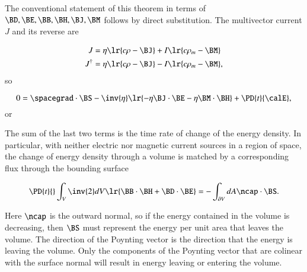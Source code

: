 The conventional statement of this theorem in terms of \( \BD, \BE, \BB, \BH, \BJ, \BM \) follows by direct substitution.
The multivector current \( J \) and its reverse are

\begin{dmath}\label{eqn:poyntingTheorem:160}
\begin{aligned}
J &= \eta \lr{ c \rho - \BJ } + I \lr{ c \rho_m - \BM } \\
J^\dagger &= \eta \lr{ c \rho - \BJ } - I \lr{ c \rho_m - \BM },
\end{aligned}
\end{dmath}
so

\begin{dmath}\label{eqn:poyntingTheorem:180}
0 =
\spacegrad \cdot \BS
-
\inv{\eta}
\lr{
- \eta \BJ \cdot \BE
- \eta \BM \cdot \BH
}
+ \PD{t}{\calE},
\end{dmath}
or

The sum of the last two terms is the time rate of change of the energy density.
In particular,
with neither electric nor magnetic current sources in a region of space,
the change of energy density through a volume is matched by a corresponding flux through the bounding surface

\begin{dmath}\label{eqn:poyntingTheorem:740}
\PD{t}{} \int_V
\inv{2} dV \lr{
\BB \cdot \BH
+ \BD \cdot \BE
}
=
-\int_{\partial V} dA \ncap \cdot \BS.
\end{dmath}

Here \( \ncap \) is the outward normal, so if the energy contained in the volume is decreasing, then \( \BS \) must represent the energy per unit area that leaves the volume.
The direction of the Poynting vector is the direction that the energy is leaving the volume.
Only the components of the Poynting vector that are colinear with the surface normal will result in energy leaving or entering the volume.

